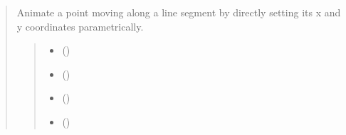 \documentclass[letterpaper,10pt,english]{sphinxmanual}
\begin{document}
\begin{quote}
\begin{fulllineitems}
\begin{fulllineitems}
\begin{quote}
\begin{description}
\begin{itemize}
\end{itemize}

\end{description}\end{quote}

\end{fulllineitems}


\begin{fulllineitems}
\label{\detokenize{pygeox:pygeox.animate.AnimateNamespace.point_sweep_line}}
\pysigstartsignatures
\pysiglinewithargsret
{}
{\sphinxparamcomma {}\sphinxparamcomma {}\sphinxparamcomma {}\sphinxparamcomma {}}
{}
\pysigstopsignatures
\sphinxAtStartPar
Animate a point moving along a line segment by directly setting its x and y coordinates parametrically.
\begin{quote}\begin{description}
\begin{itemize}
\item {} 
\sphinxAtStartPar
{} ()

\item {} 
\sphinxAtStartPar
{} ()

\item {} 
\sphinxAtStartPar
{} ()

\item {} 
\sphinxAtStartPar
{} (\sphinxstyleliteralemphasis{\sphinxupquote{ | }}\sphinxstyleliteralemphasis{\sphinxupquote{ | }}\sphinxstyleliteralemphasis{\sphinxupquote{ | }}\sphinxstyleliteralemphasis{\sphinxupquote{ | }})


\end{itemize}
\end{description}
\end{quote}
\end{fulllineitems}
\end{fulllineitems}
\end{quote}
\end{document}
